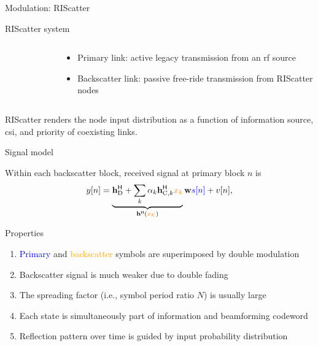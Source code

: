 \documentclass[presentation,xcolor={table},9pt]{beamer}
\begin{document}
\begin{section}{Modulation: RIScatter}
\begin{frame}{RIScatter system}
\begin{columns}
\begin{column}{0.4\textwidth}
\begin{figure}
{					}
					\label{fg:riscatter}
				\end{figure}
			\end{column}
			\begin{column}{0.5\textwidth}
				\begin{itemize}
						\item {\color{blue}Primary link:} active legacy transmission from an \gls{rf} source
						\item {\color{orange}Backscatter link:} passive free-ride transmission from RIScatter nodes
				\end{itemize}
			\end{column}
		\end{columns}
		RIScatter renders the node input distribution as a function of information source, \gls{csi}, and priority of coexisting links.
	\end{frame}

	\begin{frame}{Signal model}
		\begin{figure}[H]
			\centering
			\def\svgwidth{0.6\columnwidth}
			
			\label{fg:riscatter_network}
		\end{figure}
		Within each backscatter block, received signal at primary block $n$ is
		\begin{equation*}
			y[n] = \underbrace{\mathbf{h}_{\text{D}}^\mathsf{H} + \sum_{k} \alpha_k \mathbf{h}_{\text{C},k}^\mathsf{H} \textcolor{orange}{x_k}}_{\mathbf{h}^\mathsf{H}(\textcolor{orange}{x_{\mathcal{K}}})} \mathbf{w} \textcolor{blue}{s[n]} + v[n],
		\end{equation*}
		\vspace{-0.25cm}
		\begin{block}{Properties}
			\begin{enumerate}
				\item \textcolor{blue}{Primary} and \textcolor{orange}{backscatter} symbols are superimposed by {double modulation}
				\item Backscatter signal is much weaker due to {double fading}
				\item The spreading factor (i.e., symbol period ratio $N$) is usually large
				\item Each {state} is simultaneously part of information and beamforming {codeword}
				\item Reflection pattern over time is guided by input probability distribution
			\end{enumerate}
		\end{block}
	\end{frame}


\end{section}
\end{document}
